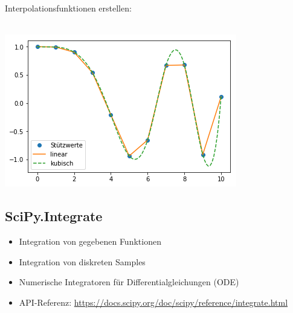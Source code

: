 \begin{minipage}[t]{0.54\textwidth}
	Interpolationsfunktionen erstellen:
	
\end{minipage}
\hspace{0.02\textwidth}
\begin{minipage}[t]{0.44\textwidth}
	$\quad$\\[1pt]
	\includegraphics[width=\textwidth]{images/v9_interpolate1}
\end{minipage}




\subsection{SciPy.Integrate}
\begin{itemize}
	\item Integration von gegebenen Funktionen
	\item Integration von diskreten Samples
	\item Numerische Integratoren für Differentialgleichungen (ODE)
	\item API-Referenz: \url{https://docs.scipy.org/doc/scipy/reference/integrate.html}
\end{itemize}

